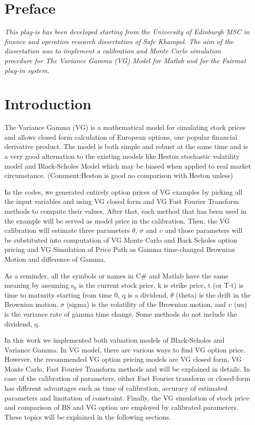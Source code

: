\newcommand{\pluginName}{Variance Gamma Model}
\newcommand{\pluginVersion}{1.0}



\section{Preface}
\emph{This plug-is has been developed starting from the University of Edinburgh MSC in finance and operation research dissertation of Safe Khampol. The aim of the dissertation was to implement a calibration and Monte Carlo simulation procedure for The Variance Gamma (VG) Model for Matlab and for the Fairmat plug-in system.} 

\section{Introduction}
The Variance Gamma (VG) is a  mathematical model for simulating stock prices and allows closed form 
calculation of European options, one popular financial derivative product. 
The model is both simple and robust at the same time and is a very good 
alternation to the existing models like Heston stochastic volatility model 
and Black-Scholes Model which may be biased when applied to real market 
circumstance. (Comment:Heston is good no comparison with Heston unless)

In the codes, we generated entirely option prices of VG examples by picking 
all the input variables and using VG closed form and VG Fast Fourier 
Transform methods to compute their values. After that, each method that has 
been used in the example will be served as model price in the calibration. 
Then, the VG calibration will estimate three parameters $\theta $, $\sigma $ 
and $\upsilon $ and those parameters will be substituted into computation of 
VG Monte Carlo and Back Scholes option pricing and VG Simulation of Price 
Path as Gamma time-changed Brownian Motion and difference of Gamma.

As a reminder, all the symbols or names in C{\#} and Matlab have the same 
meaning by assuming s$_{0}$ is the current stock price, k is strike price, t 
(or T-t) is time to maturity starting from time 0, q is a dividend, $\theta 
$ (theta) is the drift in the Brownian motion, $\sigma $ (sigma) is the 
volatility of the Brownian motion, and $\upsilon $ (nu) is the variance rate 
of gamma time change. Some methods do not include the dividend, q.

In this work we implemented both valuation models of Black-Scholes and 
Variance Gamma. In VG model, there are various ways to find VG option price. 
However, the recommended VG option pricing models are VG closed form, VG 
Monte Carlo, Fast Fourier Transform methods and will be explained in 
details. In case of the calibration of parameters, either Fast Fourier 
transform or closed-form has different advantages such as time of 
calibration, accuracy of estimated parameters and limitation of constraint. 
Finally, the VG simulation of stock price and comparison of BS and VG option 
are employed by calibrated parameters. These topics will be explained in the 
following sections.

